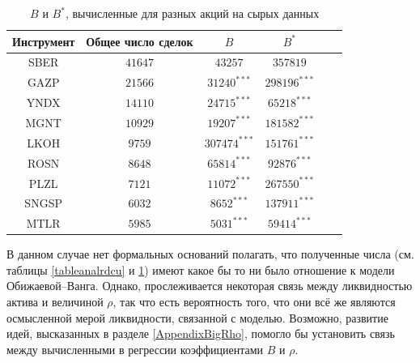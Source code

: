 \begin{appendices}
            \begin{table}[h!]
                \begin{center}
                    \begin{tabular}{|c|c|c|c|c|c|}
                        \hline
                    Инструмент        & Общее число сделок & $B$ & $B^*$ \\ \hline
                    SBER &  $41647$  & $ 43257    $ & $ 357819     $ \\ \hline
                    GAZP &  $21566$  & $ 31240^{***}    $ & $ 298196^{***}     $ \\ \hline
                    YNDX &  $14110$  & $ 24715^{***}    $ & $ 65218^{***}     $ \\ \hline
                    MGNT &  $10929$  & $ 19207^{***}    $ & $ 181582^{***}    $  \\ \hline
                    LKOH &  $9759 $ &  $307474^{***}    $ & $ 151761^{***}    $  \\ \hline
                    ROSN &  $8648 $ &  $65814^{***}     $ & $ 92876^{***}     $ \\ \hline
                    PLZL &  $7121 $ &  $11072^{***}     $ & $ 267550^{***}    $  \\ \hline
                    SNGSP & $ 6032$  & $ 8652^{***}     $ & $ 137911^{***}    $  \\ \hline
                    MTLR &  $5985 $ &  $5031^{***}      $ & $ 59414^{***}     $ \\ \hline
                    \end{tabular}
                \end{center}
                \label{tableanalrdse}
                \caption{$B$ и $B ^*$, вычисленные для разных акций на сырых данных}
            \end{table} 
            В данном случае нет формальных оснований полагать, что полученные числа 
            (см. таблицы \ref{tableanalrdcu} и \ref{tableanalrdse}) имеют какое бы то ни было отношение к модели 
            Обижаевой--Ванга. Однако, прослеживается некоторая связь между ликвидностью актива и величиной $\rho$, так что есть 
            вероятность того, что они всё же являются осмысленной мерой ликвидности, связанной с моделью. 
            Возможно, развитие идей, высказанных в разделе \ref{AppendixBigRho}, помогло бы установить связь между вычисленными в регрессии
            коэффициентами $B$ и $\rho$. 
\end{appendices}   %